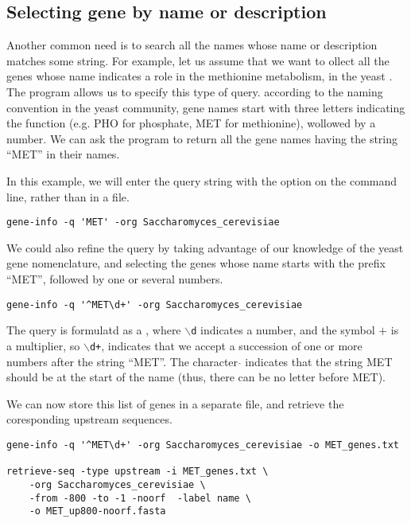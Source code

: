 \subsection{Selecting gene by name or description}

Another common need is to search all the names whose name or
description matches some string. For example, let us assume that we
want to ollect all the genes whose name indicates a role in the
methionine metabolism, in the yeast .
The program  allows us to specify this type of
query. according to the naming convention in the yeast community, gene
names start with three letters indicating the function (e.g. PHO for
phosphate, MET for methionine), wollowed by a number. We can ask the
program to return all the gene names having the string ``MET'' in
their names. 

In this example, we will enter the query string with the option
 on the command line, rather than in a file.

\begin{lstlisting}
gene-info -q 'MET' -org Saccharomyces_cerevisiae
\end{lstlisting}

We could also refine the query by taking advantage of our knowledge of
the yeast gene nomenclature, and selecting the genes whose name starts
with the prefix ``MET'', followed by one or several numbers.

\begin{lstlisting}
gene-info -q '^MET\d+' -org Saccharomyces_cerevisiae
\end{lstlisting}

The query is formulatd as a , where
\texttt{$\backslash$d} indicates a number, and the symbol $+$ is a
multiplier, so \texttt{$\backslash$d+}, indicates that we accept a
succession of one or more numbers after the string ``MET''. The
character $\hat{ }$ indicates that the string MET should be at the start of
the name (thus, there can be no letter before MET).

We can now store this list of genes in a separate file, and retrieve
the coresponding upstream sequences.


\begin{lstlisting}
gene-info -q '^MET\d+' -org Saccharomyces_cerevisiae -o MET_genes.txt

retrieve-seq -type upstream -i MET_genes.txt \
    -org Saccharomyces_cerevisiae \
    -from -800 -to -1 -noorf  -label name \
    -o MET_up800-noorf.fasta
\end{lstlisting}


